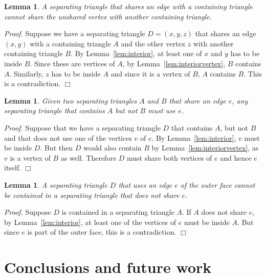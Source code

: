 \pdfoutput=1 \documentclass[12pt]{elsarticle}
\newtheorem{lem}[defin]{Lemma}
\newenvironment{lemma}{\begin{lem} \sl}{\end{lem}}
\newenvironment{proof}{\emph{Proof.}}{\hfill $\Box$ \medskip\\}
\begin{document}
\vspace{-0.5em}
\begin{lemma}
 \label{lem:unsharedvertex}
 A separating triangle that shares an edge with a containing triangle cannot share the unshared vertex with another containing triangle.
\end{lemma}
\begin{proof}
 Suppose we have a separating triangle $D = (x, y, z)$ that shares an edge $(x, y)$ with a containing triangle $A$ and the other vertex $z$ with another containing triangle $B$. By Lemma~\ref{lem:interior}, at least one of $x$ and $y$ has to be inside $B$. Since these are vertices of $A$, by Lemma~\ref{lem:interiorvertex}, $B$ contains $A$. Similarly, $z$ has to be inside $A$ and since it is a vertex of $B$, $A$ contains $B$. This is a contradiction.
\end{proof}
\vspace{-0.5em}
\begin{lemma}
 \label{lem:containingshared}
 Given two separating triangles $A$ and $B$ that share an edge $e$, any separating triangle that contains $A$ but not $B$ must use $e$.
\end{lemma}
\begin{proof}
 Suppose that we have a separating triangle $D$ that contains $A$, but not $B$ and that does not use one of the vertices $v$ of $e$. By Lemma~\ref{lem:interior}, $v$ must be inside $D$. But then $D$ would also contain $B$ by Lemma~\ref{lem:interiorvertex}, as $v$ is a vertex of $B$ as well. Therefore $D$ must share both vertices of $e$ and hence $e$ itself.
\end{proof}
\vspace{-0.5em}
\begin{lemma}
 \label{lem:outertriangle}
 A separating triangle $D$ that uses an edge $e$ of the outer face cannot be contained in a separating triangle that does not share $e$.
\end{lemma}
\begin{proof}
 Suppose $D$ is contained in a separating triangle $A$. If $A$ does not share $e$, by Lemma~\ref{lem:interior}, at least one of the vertices of $e$ must be inside $A$. But since $e$ is part of the outer face, this is a contradiction.
\end{proof}

\section{Conclusions and future work}
\label{sec:conclusions}
\end{document}
